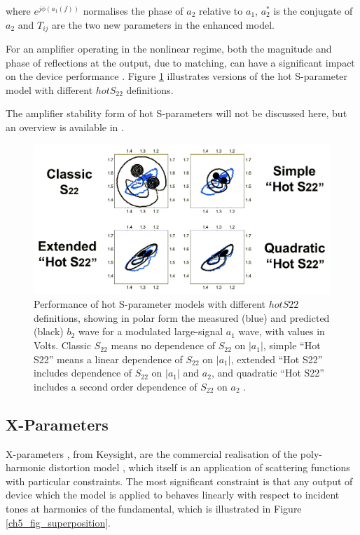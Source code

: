 \documentclass[../thesis/thesis.tex]{subfiles}
\begin{document}
\begin{refsection}
where $e^{j\phi(a_1(f))}$ normalises the phase of $a_2$ relative to $a_1$, $a_2^*$ is the conjugate of $a_2$ and $T_{ij}$ are the two new parameters in the enhanced model.

For an amplifier operating in the nonlinear regime, both the magnitude and phase of reflections at the output, due to matching, can have a significant impact on the device performance \cite[Figure 12.13]{Cripps_2006}. Figure \ref{ch5_fig_hots22} illustrates versions of the hot S-parameter model with different $hotS_{22}$ definitions.

The amplifier stability form of hot S-parameters will not be discussed here, but an overview is available in \cite{Verspecht_2005}.

\begin{figure}
	\centering
	\includegraphics[width=\linewidth]{hots22_recoloured}
	\caption[Performance of hot S-parameter models with different $hotS22$ definitions.]{Performance of hot S-parameter models with different $hotS22$ definitions, showing in polar form the measured (blue) and predicted (black) $b_2$ wave for a modulated large-signal $a_1$ wave, with values in Volts. Classic $S_{22}$ means no dependence of $S_{22}$ on $|a_1|$, simple ``Hot S22'' means a linear dependence of $S_{22}$ on $|a_1|$, extended ``Hot S22'' includes dependence of $S_{22}$ on $|a_1|$ and $a_2$, and quadratic ``Hot S22'' includes a second order dependence of $S_{22}$ on $a_2$ \cite{Verspecht_2002}.}
	\label{ch5_fig_hots22}
\end{figure}

\subsection{X-Parameters}

X-parameters \cite{Root_2013}, from Keysight, are the commercial realisation of the poly-harmonic distortion model \cite{Verspecht_2006}, which itself is an application of scattering functions with particular constraints. The most significant constraint is that any output of device which the model is applied to behaves linearly with respect to incident tones at harmonics of the fundamental, which is illustrated in Figure \ref{ch5_fig_superposition}. 


\end{refsection}
\end{document}
